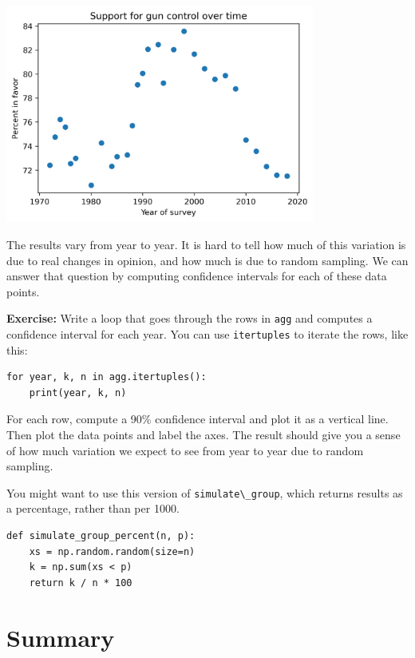 \begin{center}
\includegraphics[width=4in]{chapters/11_resampling_files/11_resampling_93_0.png}
\end{center}

The results vary from year to year. It is hard to tell how much of this
variation is due to real changes in opinion, and how much is due to
random sampling. We can answer that question by computing confidence
intervals for each of these data points.

\textbf{Exercise:} Write a loop that goes through the rows in
\passthrough{\lstinline!agg!} and computes a confidence interval for
each year. You can use \passthrough{\lstinline!itertuples!} to iterate
the rows, like this:

\begin{lstlisting}
for year, k, n in agg.itertuples():
    print(year, k, n)
\end{lstlisting}

For each row, compute a 90\% confidence interval and plot it as a
vertical line. Then plot the data points and label the axes. The result
should give you a sense of how much variation we expect to see from year
to year due to random sampling.

You might want to use this version of
\passthrough{\lstinline!simulate\_group!}, which returns results as a
percentage, rather than per 1000.

\begin{lstlisting}[]
def simulate_group_percent(n, p):
    xs = np.random.random(size=n)
    k = np.sum(xs < p)
    return k / n * 100
\end{lstlisting}

\hypertarget{summary}{%
\section{Summary}\label{summary}}

